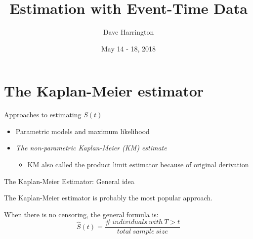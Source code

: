 \documentclass[ignorenonframetext,]{beamer}
\title{Estimation with Event-Time Data}
\author{Dave Harrington}
\date{May 14 - 18, 2018}
\providecommand{\tightlist}{%
  \setlength{\itemsep}{0pt}\setlength{\parskip}{0pt}}
\begin{document}
\frame{\titlepage}

\begin{frame}
\tableofcontents[hideallsubsections]
\end{frame}
\hypertarget{the-kaplan-meier-estimator}{%
\section{The Kaplan-Meier estimator}\label{the-kaplan-meier-estimator}}

\begin{frame}{%
\protect\hypertarget{approaches-to-estimating-st}{%
Approaches to estimating \(S(t)\)}}

\begin{itemize}
\item
  Parametric models and maximum likelihood
\item
  \emph{The non-parametric Kaplan-Meier (KM) estimate}

  \begin{itemize}
  \tightlist
  \item
    KM also called the product limit estimator because of original
    derivation
  \end{itemize}
\end{itemize}

\end{frame}

\begin{frame}{%
\protect\hypertarget{the-kaplan-meier-estimator-general-idea}{%
The Kaplan-Meier Estimator: General idea}}

The Kaplan-Meier estimator is probably the most popular approach.

When there is no censoring, the general formula is: \[
\widehat{S}(t) = \frac{\#~individuals~ with~T >  t}{total~sample~size}
\]

\end{frame}
\end{document}
